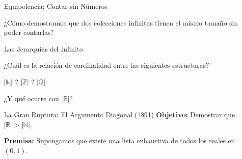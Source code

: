 \documentclass[10pt, aspectratio=169]{beamer}
\begin{document}
\begin{frame}{Equipolencia: Contar sin Números}
    \begin{center}
        ¿Cómo demostramos que dos colecciones infinitas tienen el mismo tamaño sin poder contarlas?
        
        \vspace{0.8cm}
    \end{center}
\end{frame}

\begin{frame}{Las Jerarquías del Infinito}
    \begin{center}
        \Large
        ¿Cuál es la relación de cardinalidad entre las siguientes estructuras?
        
        \vspace{0.8cm}
        $|\mathbb{N}|$ \quad ? \quad $|\mathbb{Z}|$ \quad ? \quad $|\mathbb{Q}|$
        
        \vspace{1.2cm}
        ¿Y qué ocurre con $|\mathbb{R}|$?
    \end{center}
\end{frame}

\begin{frame}{La Gran Ruptura: El Argumento Diagonal (1891)}
            \textbf{Objetivo:} 
            Demostrar que $|\mathbb{R}| > |\mathbb{N}|$.
            
            \vspace{0.5cm}
            \textbf{Premisa:}
            Supongamos que existe una lista exhaustiva de todos los reales en $(0,1)$.
\end{frame}
\end{document}
